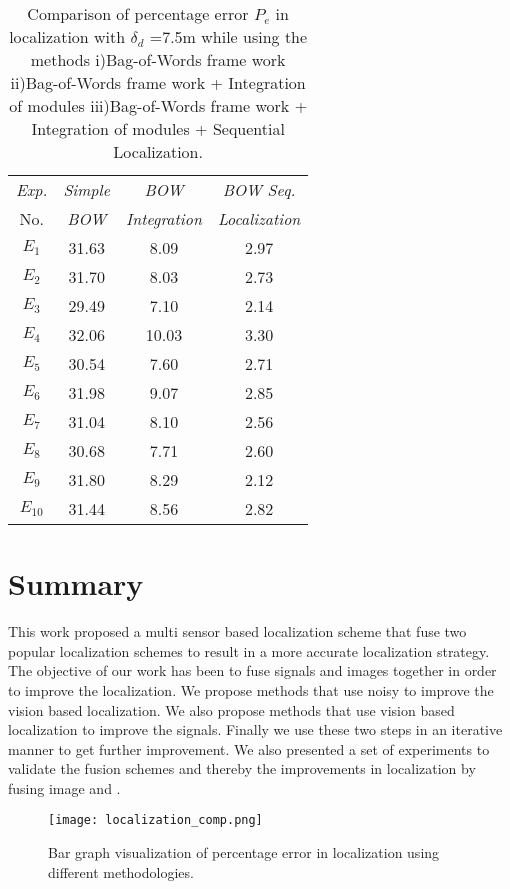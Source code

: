 \begin{table}[h]
\centering
\caption{Comparison of percentage error $P_e$ in localization with $\delta_d$ =7.5m while using the methods i)Bag-of-Words frame work ii)Bag-of-Words frame work + Integration of modules iii)Bag-of-Words frame work + Integration of modules + Sequential Localization.}
\begin{tabular}{|c|c|c|c|}
\hline
\textit{Exp.} & \textit{Simple} & \textit{BOW} & \textit{BOW Seq.} \\
No. & \textit{BOW} & \textit{Integration} & \textit{Localization} \\ \hline
	$E_1$ & 31.63 & 8.09  & 2.97 \\ \hline
	$E_2$ & 31.70 & 8.03 &  2.73 \\ \hline
	$E_3$ & 29.49 & 7.10 &  2.14 \\ \hline
	$E_4$ & 32.06 & 10.03 & 3.30 \\ \hline
	$E_5$ & 30.54 & 7.60 &  2.71 \\ \hline
	$E_6$ & 31.98 & 9.07 &  2.85  \\ \hline
	$E_7$ & 31.04 & 8.10 &  2.56 \\ \hline	
	$E_8$ & 30.68 & 7.71 &  2.60 \\ \hline
	$E_9$ & 31.80 & 8.29 &  2.12 \\ \hline
	$E_{10}$ & 31.44 & 8.56 &  2.82 \\ \hline
\end{tabular}
\label{table:per_err_integrated_bow}
\end{table}
\newpage

\section{Summary}
\label{sec:summary}
This work proposed a multi sensor based localization scheme that  fuse two 
popular localization schemes to result in a more accurate localization strategy.
The objective of our work has been to fuse \gps signals and images together 
in order to improve the localization. We propose methods that use noisy \gps to
improve the vision based localization. We also propose methods that use vision based
localization to improve the \gps signals. Finally we use these two steps in an iterative
manner to get further improvement.
We also presented a set of experiments to validate the fusion schemes and thereby the
improvements in localization by fusing image and \gps.

\begin{figure}[t]
\centering
\texttt{[image: localization\_comp.png]}
\caption{Bar graph visualization of percentage error in localization using different methodologies.}
\label{fig:localization_comp}
\end{figure}